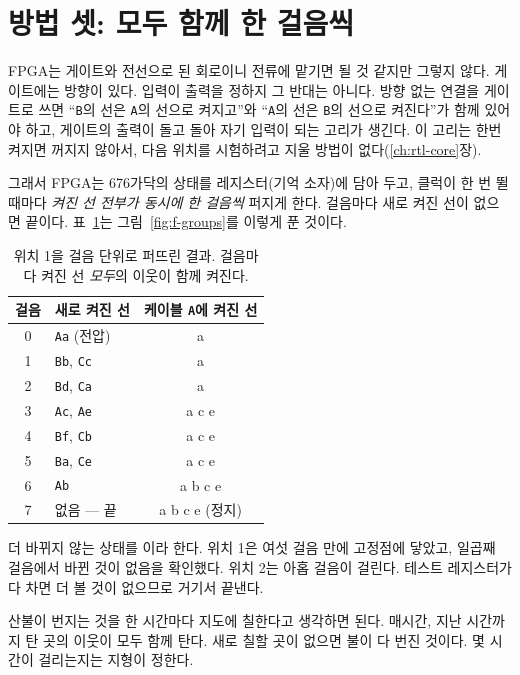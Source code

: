 \section{방법 셋: 모두 함께 한 걸음씩}\label{sec:f-rounds}

\Why FPGA는 게이트와 전선으로 된 회로이니 전류에 맡기면 될 것 같지만 그렇지 않다. 게이트에는 방향이 있다. 입력이
출력을 정하지 그 반대는 아니다. 방향 없는 연결을 게이트로 쓰면 ``\texttt{B}의 선은 \texttt{A}의 선으로 켜지고''와
``\texttt{A}의 선은 \texttt{B}의 선으로 켜진다''가 함께 있어야 하고, 게이트의 출력이 돌고 돌아 자기 입력이 되는
고리가 생긴다. 이 고리는 한번 켜지면 꺼지지 않아서, 다음 위치를 시험하려고 지울 방법이 없다(\ref{ch:rtl-core}장).

그래서 FPGA는 676가닥의 상태를 레지스터(기억 소자)에 담아 두고, 클럭이 한 번 뛸 때마다 \emph{켜진 선 전부가 동시에
한 걸음씩} 퍼지게 한다. 걸음마다 새로 켜진 선이 없으면 끝이다. 표~\ref{tab:f-rounds}는 그림~\ref{fig:f-groups}를
이렇게 푼 것이다.

\begin{table}[ht]
\centering
\caption{위치 1을 걸음 단위로 퍼뜨린 결과. 걸음마다 켜진 선 \emph{모두}의 이웃이 함께 켜진다.}
\label{tab:f-rounds}
\small
\begin{tabular}{c l c}
\toprule
걸음 & 새로 켜진 선 & 케이블 \texttt{A}에 켜진 선 \\
\midrule
0 & \texttt{Aa} (전압) & a \\
1 & \texttt{Bb}, \texttt{Cc} & a \\
2 & \texttt{Bd}, \texttt{Ca} & a \\
3 & \texttt{Ac}, \texttt{Ae} & a c e \\
4 & \texttt{Bf}, \texttt{Cb} & a c e \\
5 & \texttt{Ba}, \texttt{Ce} & a c e \\
6 & \texttt{Ab} & a b c e \\
7 & 없음 --- 끝 & a b c e (정지) \\
\bottomrule
\end{tabular}
\end{table}

더 바뀌지 않는 상태를 이라 한다. 위치 1은 여섯 걸음 만에 고정점에 닿았고, 일곱째 걸음에서
바뀐 것이 없음을 확인했다. 위치 2는 아홉 걸음이 걸린다. 테스트 레지스터가 다 차면 더 볼 것이 없으므로 거기서
끝낸다.

\General 산불이 번지는 것을 한 시간마다 지도에 칠한다고 생각하면 된다. 매시간, 지난 시간까지 탄 곳의 이웃이 모두
함께 탄다. 새로 칠할 곳이 없으면 불이 다 번진 것이다. 몇 시간이 걸리는지는 지형이 정한다.

